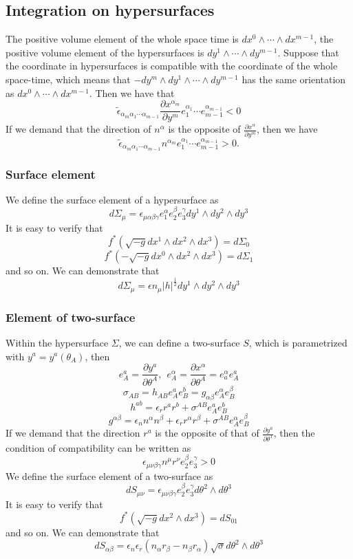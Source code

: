 \subsection{Integration on hypersurfaces}
\noindent
The positive volume element of the whole space time is $dx^{0} \wedge \cdots \wedge dx^{m-1}$, the positive volume element of the hypersurfaces is $dy^{1} \wedge \cdots \wedge dy^{m-1}$.
Suppose that the coordinate in hypersurfaces is compatible with the  coordinate of the whole space-time, which means that $-dy^{m} \wedge dy^1 \wedge \cdots \wedge dy^{m-1} $ has the same orientation as $dx^0 \wedge \cdots \wedge dx^{m-1}$. Then we have that
\[\tilde{\epsilon}_{\alpha_{m} \alpha_{1} \cdots \alpha_{m-1}} \frac{\partial x^{\alpha_m}}{\partial y^m} e_1^{\alpha_1} \cdots e_{m-1}^{\alpha_{m-1}} < 0\]
If we demand that the direction of $n^{\alpha}$ is the opposite of $\frac{\partial x^{\alpha}}{\partial y^m}$, then we have
\[\tilde{\epsilon}_{\alpha_{m} \alpha_{1} \cdots \alpha_{m-1}} n^{\alpha_m} e_1^{\alpha_1} \cdots e_{m-1}^{\alpha_{m-1}} > 0.\]

\subsubsection{Surface element}
\noindent
We define the surface element of a hypersurface as
\[d\Sigma_{\mu} = \epsilon_{\mu \alpha \beta \gamma} e_{1}^{\alpha} e_{2}^{\beta} e_{3}^{\gamma} dy^1 \wedge dy^2 \wedge dy^3\]
It is easy to verify that
\[f^*(\sqrt{-g} dx^1 \wedge dx^2 \wedge dx^3) = d\Sigma_0\]
\[f^*(-\sqrt{-g} dx^0 \wedge dx^2 \wedge dx^3) = d\Sigma_1\]
and so on.
We can demonstrate that
\[d\Sigma_{\mu} = \epsilon n_{\mu} |h|^{\frac{1}{2}} dy^1 \wedge dy^2 \wedge dy^3\]

\subsubsection{Element of two-surface}
\noindent
Within the hypersurface $\Sigma$, we can define a two-surface $S$, which is parametrized with $y^a = y^a(\theta_A)$, then
\[e_A^a = \frac{\partial y^a}{\partial \theta^A}, \ \ e_A^{\alpha} = \frac{\partial x^{\alpha}}{\partial \theta^{A}} = e_a^{\alpha} e_A^a \]
\[\sigma_{AB} = h_{AB}e_A^a e_B^b = g_{\alpha \beta} e_A^{\alpha} e_B^{\beta}\]
\[h^{ab} = \epsilon_r r^a r^b + \sigma^{AB} e_A^a e_B^b\]
\[g^{\alpha \beta} = \epsilon_n n^{\alpha} n^{\beta} + \epsilon_r r^{\alpha} r^{\beta} + \sigma^{AB} e_A^{\alpha} e_B^{\beta}\]
If we demand that the direction $r^a$ is the opposite of that of $\frac{\partial y^a}{\partial \theta^{1}}$, then the condition of compatibility can be written as
\[\epsilon_{\mu \nu \beta \gamma}n^{\mu} r^{\nu} e_2^{\beta} e_3^{\gamma} > 0\]
We define the surface element of a two-surface as
\[dS_{\mu \nu} = \epsilon_{\mu \nu \beta \gamma} e_2^{\beta} e_3^{\gamma} d\theta^2 \wedge d\theta^3\]
It is easy to verify that
\[f^*(\sqrt{-g} dx^2 \wedge dx^3) = dS_{01}\]
and so on. We can demonstrate that
\[dS_{\alpha \beta} = \epsilon_n \epsilon_r (n_{\alpha}r_{\beta} - n_{\beta}r_{\alpha}) \sqrt{\sigma} d\theta^2 \wedge d\theta^3\]

